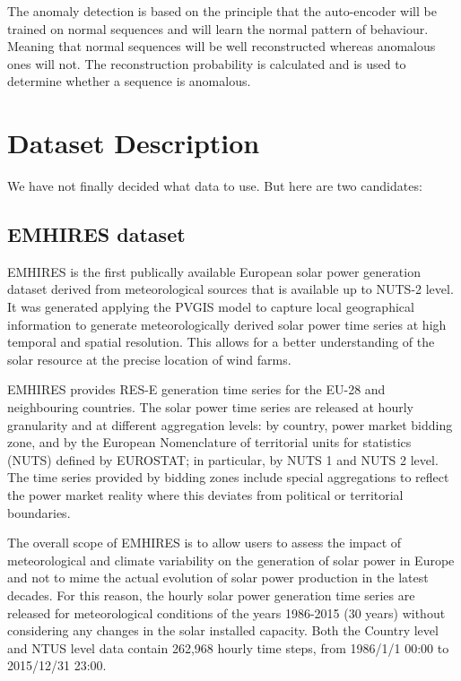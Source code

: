 \documentclass{article}
\begin{document}
The anomaly detection is based on the principle that the auto-encoder will be trained on normal sequences and will learn the normal pattern of behaviour. Meaning that normal sequences will be well reconstructed whereas anomalous ones will not. The reconstruction probability is calculated and is used to determine whether a sequence is anomalous. 

\section{Dataset Description}
We have not finally decided what data to use. But here are two candidates:

\subsection{EMHIRES dataset}
EMHIRES is the first publically available European solar power generation dataset derived from meteorological sources that is available up to NUTS-2 level. It was generated applying the PVGIS model to capture local geographical information to generate meteorologically derived solar power time series at high temporal and spatial resolution. This allows for a better understanding of the solar resource at the precise location of wind farms.

EMHIRES provides RES-E generation time series for the EU-28 and neighbouring countries. The solar power time series are released at hourly granularity and at different aggregation levels: by country, power market bidding zone, and by the European Nomenclature of territorial units for statistics (NUTS) defined by EUROSTAT; in particular, by NUTS 1 and NUTS 2 level. The time series provided by bidding zones include special aggregations to reflect the power market reality where this deviates from political or territorial boundaries.

The overall scope of EMHIRES is to allow users to assess the impact of meteorological and climate variability on the generation of solar power in Europe and not to mime the actual evolution of solar power production in the latest decades. For this reason, the hourly solar power generation time series are released for meteorological conditions of the years 1986-2015 (30 years) without considering any changes in the solar installed capacity. Both the Country level and NTUS level data contain 262,968 hourly time steps, from 1986/1/1 00:00 to 2015/12/31 23:00.
\end{document}
